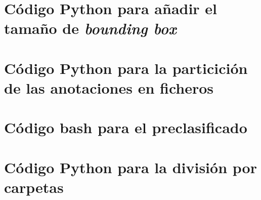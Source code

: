 \documentclass[12pt]{report} %
\begin{document}
    \section*{Código Python para añadir el tamaño de \textit{bounding box}}
    \label{mod_ball}
    

    \section*{Código Python para la particición de las anotaciones en ficheros}
    

    \section*{Código bash para el preclasificado}
    \label{preclasificado}
    

    \section*{Código Python para la división por carpetas}
    \label{div_carpetas}
    
\end{document}
